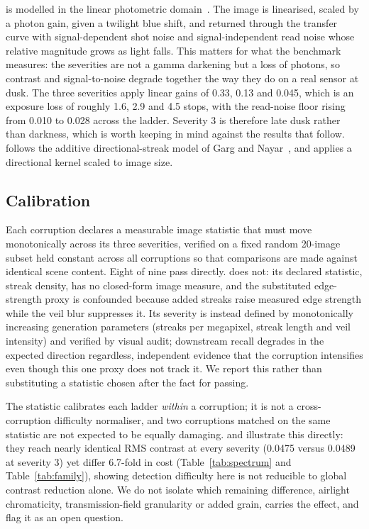  is modelled in the linear photometric
domain~\cite{chen2018dark}. The image is linearised, scaled by a photon
gain, given a twilight blue shift, and returned through the transfer
curve with signal-dependent shot noise and signal-independent read noise
whose relative magnitude grows as light falls. This matters for what the
benchmark measures: the severities are not a gamma darkening but a loss
of photons, so contrast and signal-to-noise degrade together the way
they do on a real sensor at dusk. The three severities apply linear
gains of 0.33, 0.13 and 0.045, which is an exposure loss of roughly 1.6,
2.9 and 4.5 stops, with the read-noise floor rising from 0.010 to 0.028
across the ladder. Severity 3 is therefore late dusk rather than
darkness, which is worth keeping in mind against the results that
follow.  follows the additive
directional-streak model of Garg and Nayar~\cite{garg2007rain}, and
 applies a directional kernel scaled to image size.

\subsection{Calibration}

Each corruption declares a measurable image statistic that must move
monotonically across its three severities, verified on a fixed random
20-image subset held constant across all corruptions so that comparisons
are made against identical scene content. Eight of nine pass directly.
 does not: its declared statistic, streak density,
has no closed-form image measure, and the substituted edge-strength
proxy is confounded because added streaks raise measured edge strength
while the veil blur suppresses it. Its severity is instead defined by
monotonically increasing generation parameters (streaks per megapixel,
streak length and veil intensity) and verified by visual audit;
downstream recall degrades in the expected direction regardless,
independent evidence that the corruption intensifies even though this
one proxy does not track it. We report this rather than substituting a
statistic chosen after the fact for passing.

The statistic calibrates each ladder \emph{within} a corruption; it is
not a cross-corruption difficulty normaliser, and two corruptions
matched on the same statistic are not expected to be equally damaging.
 and  illustrate this directly: they
reach nearly identical RMS contrast at every severity (0.0475 versus
0.0489 at severity 3) yet differ 6.7-fold in cost
(Table~\ref{tab:spectrum} and Table~\ref{tab:family}), showing detection
difficulty here is not reducible to global contrast reduction alone. We
do not isolate which remaining difference, airlight chromaticity,
transmission-field granularity or added grain, carries the effect, and
flag it as an open question.

